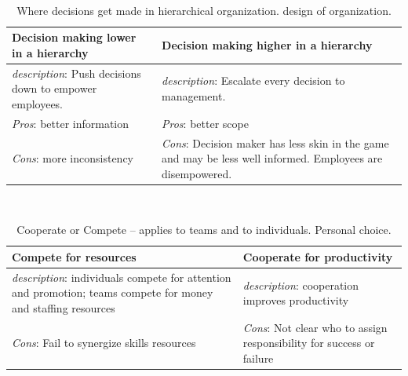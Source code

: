 \ \\

\begin{center}
\begin{table}[ht]
\begin{tabular}{ | m{\dilemmatablewidth}| m{\dilemmatablewidth} | } 
  \hline
  \textbf{Decision making lower in a hierarchy} &
  \textbf{Decision making higher in a hierarchy} \\
  \hline
  \textit{description}: Push decisions down to empower employees. &
  \textit{description}: Escalate every decision to management. \\  
  \hline
  \textit{Pros}: better information &
  \textit{Pros}: better scope \\
  \hline
  \textit{Cons}: more inconsistency & 
  \textit{Cons}: Decision maker has less skin in the game and may be less well informed. Employees are disempowered. \\
  \hline
\end{tabular}
\caption{Where decisions get made in hierarchical organization.
{\tiny design of organization.}
}
\label{table:decisions_low-vs-high}
\end{table}
\end{center}

\ \\

\begin{center}
\begin{table}[ht]
\begin{tabular}{ | m{\dilemmatablewidth}| m{\dilemmatablewidth} | } 
  \hline
  \textbf{Compete for resources} &
  \textbf{Cooperate for productivity} \\
  \hline
  \textit{description}: individuals compete for attention and promotion; teams compete for money and staffing resources &
  \textit{description}: cooperation improves productivity \\  
  \hline
  \textit{Cons}: Fail to synergize skills resources & 
  \textit{Cons}: Not clear who to assign responsibility for success or failure \\
  \hline
\end{tabular}
\caption{Cooperate or Compete -- applies to teams and to individuals. 
{\tiny Personal choice.}
}
\label{table:cooperate-vs-compete}
\end{table}
\end{center}

\ \\

